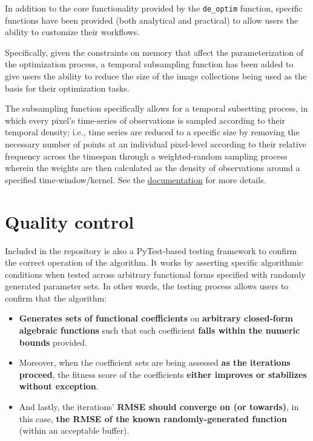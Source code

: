 \documentclass{jors}
\begin{document}
In addition to the core functionality provided by the \texttt{de\_optim} function, specific functions have been provided (both analytical and practical) to allow users the ability to customize their workflows.

Specifically, given the constraints on memory that affect the parameterization of the optimization process, a temporal subsampling function has been added to give  users the ability to reduce the size of the image collections being used as the basis for their optimization tasks.

The subsampling function specifically allows for a temporal subsetting process, in which every pixel's time-series of observations is sampled according to their temporal density; i.e., time series are reduced to a specific size by removing  the necessary number of points at an individual pixel-level according to their  relative frequency across the timespan through a weighted-random sampling  process wherein the weights are then calculated as the density of observations  around a specified time-window/kernel. See the \href{https://uzh-eoas.github.io/geeode/subsampling/}{documentation} for more details.


\section*{Quality control}

Included in the repository is also a PyTest‑based testing framework to confirm the correct operation of the algorithm. It works by asserting specific algorithmic conditions when tested across arbitrary functional forms specified with randomly generated parameter sets. In other words, the testing process allows users to confirm that the algorithm:

\begin{itemize}
  \item \textbf{Generates sets of functional coefficients} on \textbf{arbitrary closed‑form algebraic functions} such that each coefficient \textbf{falls within the numeric bounds} provided.
  \item Moreover, when the coefficient sets are being assessed \textbf{as the iterations proceed}, the fitness score of the coefficients \textbf{either improves or stabilizes without exception}.
  \item And lastly, the iterations' \textbf{RMSE should converge on (or towards)}, in this case, \textbf{the RMSE of the known randomly-generated function} (within an acceptable buffer).
\end{itemize}
\end{document}
